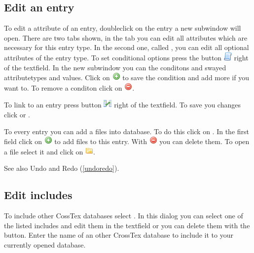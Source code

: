 \documentclass[a4paper,10pt]{scrartcl}
\begin{document}
\subsection{Edit an entry}\label{editentry}
To edit a attribute of an entry, doubleclick on the entry a new subwindow will
open. There are two tabs shown, in the tab \requiredfields you can edit all
attributes which are necessary for this entry type.
In the second one, called  \optionalfields, you can edit all optional
attributes of the entry type. To set conditional options press the button
\includegraphics{./images/script.png} right of the textfield. In the new
subwindow you can the conditons and swayed attributetypes and values. Click
on \includegraphics{./images/add.png} to save the condition and add more if
you want to. To remove a conditon click on
\includegraphics{./images/delete.png}.

To link to an entry press button
\includegraphics{./images/table_relationship.png} right of the textfield. To
save you changes click \ok or \apply.

To every entry you can add a files into database. To do this click on
\optionalfields. In the first field click on
\includegraphics{./images/add.png} to add files to this entry. With
\includegraphics{./images/delete.png} you can delete them. To open a file
select it and click on \includegraphics{./images/folder.png}.

See also Undo and Redo (\ref{undoredo}).
\subsection{Edit includes}
To include other CossTex databases select \clickpath{\edit}{\IncludeText}. In
this dialog you can select one of the listed includes and edit them in the
\LabelText textfield or you can delete them with the \remove button. Enter the
name of an other CrossTex database to include it to your currently opened
database.
\end{document}
